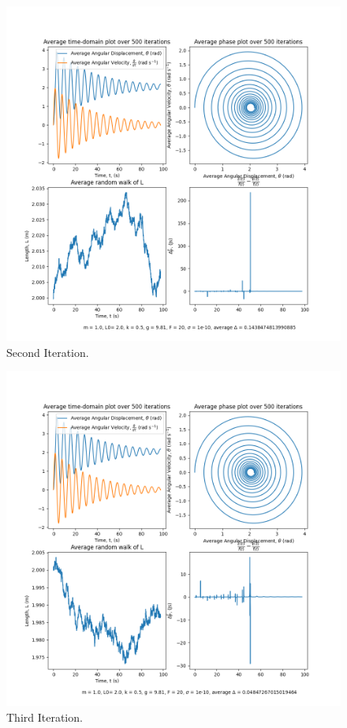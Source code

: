 \documentclass[10pt, twocolumn]{article}
\begin{document}
\begin{figure}[H]
    \centering
    \includegraphics[width = \columnwidth]{Projects/ForcedSimplePendulum/Plots/m = 1.0, L0= 2.0, k = 0.5, g = 9.81, F = 20, sigma = 1e-10, run number 1.png}
    \caption{Second Iteration.}
    \label{Second Iteration.}
\end{figure}

\begin{figure}[H]
    \centering
    \includegraphics[width = \columnwidth]{Projects/ForcedSimplePendulum/Plots/m = 1.0, L0= 2.0, k = 0.5, g = 9.81, F = 20, sigma = 1e-10, run number 2.png}
    \caption{Third Iteration.}
    \label{Third Iteration}
\end{figure}
\end{document}
